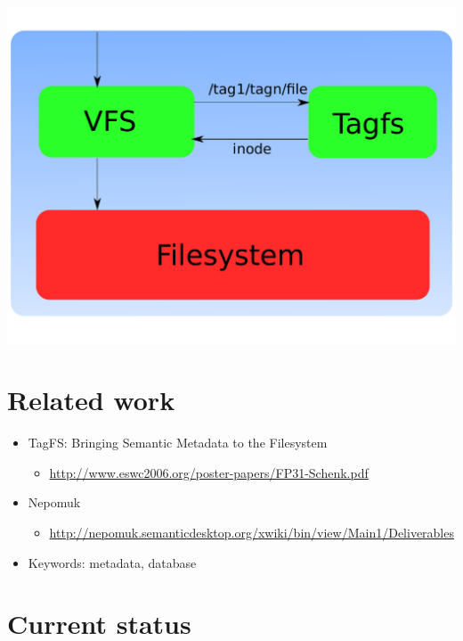 \documentclass{beamer}
\begin{document}
\begin{frame}
  \includegraphics[scale=0.6]{art/archdetail.pdf}
\end{frame}

\section{Related work}

\begin{frame}
  \begin{itemize}
  \item TagFS: Bringing Semantic Metadata to the Filesystem
    \begin{itemize}
    \item \url{http://www.eswc2006.org/poster-papers/FP31-Schenk.pdf}
    \end{itemize}
    
  \item Nepomuk
    \begin{itemize}
    \item \url{http://nepomuk.semanticdesktop.org/xwiki/bin/view/Main1/Deliverables}
    \end{itemize}
    
  \item Keywords: metadata, database
  \end{itemize}
  
\end{frame}

\section{Current status}
\end{document}
